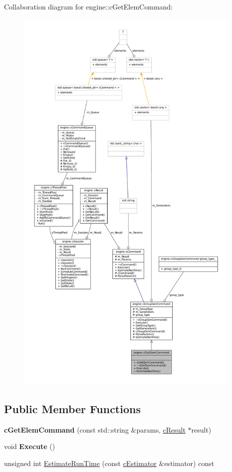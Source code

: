 \-Collaboration diagram for engine\-:\-:c\-Get\-Elem\-Command\-:
\nopagebreak
\begin{figure}[H]
\begin{center}
\leavevmode
\includegraphics[height=550pt]{classengine_1_1cGetElemCommand__coll__graph}
\end{center}
\end{figure}
\subsection*{\-Public \-Member \-Functions}
\begin{DoxyCompactItemize}
\item 
\hypertarget{classengine_1_1cGetElemCommand_ae65189d2ef82b1ca49295268846b1dd6}{{\bfseries c\-Get\-Elem\-Command} (const std\-::string \&params, \hyperlink{classengine_1_1cResult}{c\-Result} $\ast$result)}\label{classengine_1_1cGetElemCommand_ae65189d2ef82b1ca49295268846b1dd6}

\item 
\hypertarget{classengine_1_1cGetElemCommand_a16a627c20d55b3f2538bab7f63a04a04}{void {\bfseries \-Execute} ()}\label{classengine_1_1cGetElemCommand_a16a627c20d55b3f2538bab7f63a04a04}

\item 
unsigned int \hyperlink{classengine_1_1cGetElemCommand_ad84c73fe5b4db65679f28c427d201434}{\-Estimate\-Run\-Time} (const \hyperlink{classengine_1_1cEstimator}{c\-Estimator} \&estimator) const 
\end{DoxyCompactItemize}


